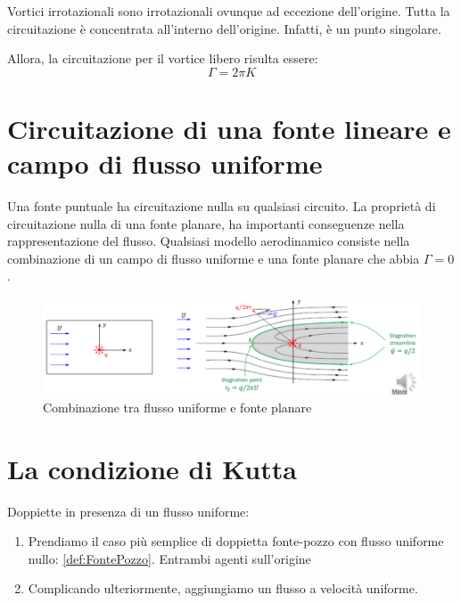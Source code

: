 Vortici irrotazionali sono irrotazionali ovunque ad eccezione dell'origine. Tutta la circuitazione è concentrata all'interno dell'origine. Infatti, è un punto singolare.

Allora, la circuitazione per il vortice libero risulta essere:
\begin{equation}
\Gamma = 2\pi K
\label{eqn:CircFreeVortex}
\end{equation}

\section{Circuitazione di una fonte lineare e campo di flusso uniforme}
Una fonte puntuale ha circuitazione nulla su qualsiasi circuito.
La proprietà di circuitazione nulla di una fonte planare, ha importanti conseguenze nella rappresentazione del flusso.
Qualsiasi modello aerodinamico consiste nella combinazione di un campo di flusso uniforme e una fonte planare che abbia $\Gamma = 0$.

\begin{figure}
\centering
\includegraphics[width = \textwidth]{gfx/ComboFlussoFonte}
\caption{Combinazione tra flusso uniforme e fonte planare}
\label{fig:ComboFlussoFonte}
\end{figure}

\section{La condizione di Kutta}
Doppiette in presenza di un flusso uniforme:
\begin{enumerate}
\item Prendiamo il caso più semplice di doppietta fonte-pozzo con flusso uniforme nullo: \ref{def:FontePozzo}.
Entrambi agenti sull'origine
\item Complicando ulteriormente, aggiungiamo un flusso a velocità uniforme.
\end{enumerate}


